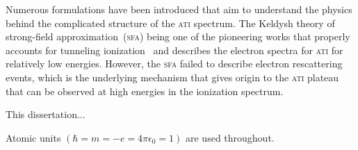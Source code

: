 Numerous formulations have been introduced that aim to understand the
physics behind the complicated structure of the \textsc{ati} spectrum.
The Keldysh theory of strong-field approximation~(\textsc{sfa}) being
one of the pioneering works that properly accounts for tunneling
ionization~\cite{KeldyshSFA} and describes the electron spectra for
\textsc{ati} for relatively low energies. However, the \textsc{sfa}
failed to describe electron rescattering events, which is the
underlying mechanism that gives origin to the \textsc{ati} plateau
that can be observed at high energies in the ionization spectrum.








This dissertation...



Atomic units $(\hbar = m = -e = 4\pi\epsilon_{0} = 1)$ are used
throughout.
































